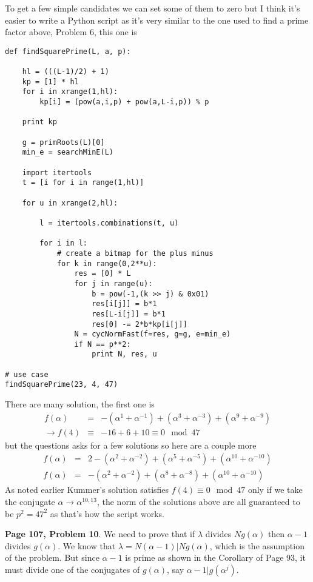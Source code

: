 \documentclass[aps,preprint,preprintnumbers,nofootinbib,showpacs,prd]{revtex4-1}
\newcommand{\nbea}{\begin{eqnarray*}}
\newcommand{\neea}{\end{eqnarray*}}
\begin{document}
To get a few simple candidates we can set some of them to zero but I think it's easier to write a Python script as it's very similar to the one used to find a prime factor above, Problem 6, this one is
%
\begin{Verbatim}[baselinestretch=0.75]
def findSquarePrime(L, a, p):
    
    hl = (((L-1)/2) + 1)
    kp = [1] * hl
    for i in xrange(1,hl):
        kp[i] = (pow(a,i,p) + pow(a,L-i,p)) % p

    print kp

    g = primRoots(L)[0]
    min_e = searchMinE(L)
    
    import itertools
    t = [i for i in range(1,hl)]
    
    for u in xrange(2,hl):
        
        l = itertools.combinations(t, u)

        for i in l:
            # create a bitmap for the plus minus
            for k in range(0,2**u):
                res = [0] * L
                for j in range(u):
                    b = pow(-1,(k >> j) & 0x01)
                    res[i[j]] = b*1
                    res[L-i[j]] = b*1
                    res[0] -= 2*b*kp[i[j]]
                N = cycNormFast(f=res, g=g, e=min_e)
                if N == p**2:
                    print N, res, u
                    
# use case
findSquarePrime(23, 4, 47)
\end{Verbatim}
%
There are many solution, the first one is
%
\nbea
f(\alpha) & = & -(\alpha^{1} + \alpha^{-1}) + (\alpha^{3} + \alpha^{-3}) + (\alpha^{9} + \alpha^{-9}) \\
\to f(4) & \equiv & -16 + 6 + 10 \equiv 0 \mod{47} 
\neea
%
but the questions asks for a few solutions so here are a couple more
%
\nbea
f(\alpha) & = & 2 - (\alpha^{2} + \alpha^{-2}) + (\alpha^{5} + \alpha^{-5}) + (\alpha^{10} + \alpha^{-10}) \\
f(\alpha) & = & - (\alpha^{2} + \alpha^{-2}) + (\alpha^{8} + \alpha^{-8}) + (\alpha^{10} + \alpha^{-10})
\neea
%
As noted earlier Kummer's solution satisfies $f(4) \equiv 0 \mod{47}$ only if we take the conjugate $\alpha \to \alpha^{10,13}$, the norm of the solutions above are all guaranteed to be $p^2 = 47^2$ as that's how the script works.

{\bf Page 107, Problem 10}. We need to prove that if $\lambda$ divides $Ng(\alpha)$ then $\alpha - 1$ divides $g(\alpha)$. We know that $\lambda = N(\alpha - 1) | Ng(\alpha)$, which is the assumption of the problem. But since $\alpha - 1$ is prime as shown in the Corollary of Page 93, it must divide one of the conjugates of $g(\alpha)$, say $\alpha - 1 | g(\alpha^j)$.
\end{document}
